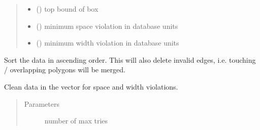\documentclass[a4paper,10pt,english]{sphinxmanual}
\begin{document}
\begin{fulllineitems}
\begin{fulllineitems}
\begin{quote}
\begin{description}
\begin{itemize}
\item {} 
 () \textendash{} top bound of box

\item {} 
 () \textendash{} minimum space violation in database units

\item {} 
 () \textendash{} minimum width violation in database units

\end{itemize}

\end{description}\end{quote}

\end{fulllineitems}


\begin{fulllineitems}
\label{\detokenize{drc:kppc.drc.kppc.drc.slcleaner.PyDrcSl.sort}}
Sort the data in ascending order. This will also delete invalid edges, i.e. touching / overlapping polygons will be merged.

\end{fulllineitems}


\begin{fulllineitems}
\label{\detokenize{drc:kppc.drc.kppc.drc.slcleaner.PyDrcSl.clean}}
Clean data in the vector for space and width violations.
\begin{quote}\begin{description}
\item[{Parameters}] \leavevmode
{} \textendash{} number of max tries

\end{description}\end{quote}

\end{fulllineitems}


\end{fulllineitems}
\end{document}
